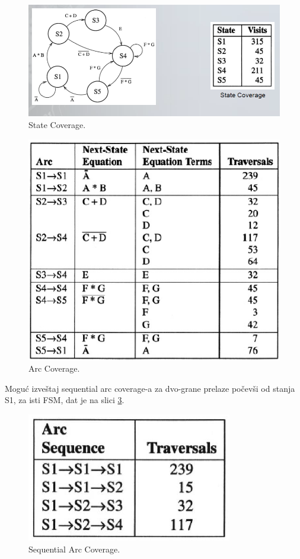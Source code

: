 \documentclass[a4paper, 12pt]{article}
\begin{document}
\begin{figure}[h!]
\centering
\includegraphics[scale=0.5]{img-state-coverage.png}
\caption{State Coverage.}
\label{img-state-coverage}
\end{figure}

\begin{figure}[h!]
\centering
\includegraphics[scale=0.5]{img-arc-coverage.png}
\caption{Arc Coverage.}
\label{img-arc-coverage}
\end{figure}

\indent Moguć izveštaj sequential arc coverage-a za dvo-grane prelaze počevši od stanja S1, za isti FSM, dat je na slici \ref{img-sequential-arc-coverage}.

\begin{figure}[h!]
\centering
\includegraphics[scale=0.5]{img-sequential-arc-coverage.png}
\caption{Sequential Arc Coverage.}
\label{img-sequential-arc-coverage}
\end{figure}
\end{document}
